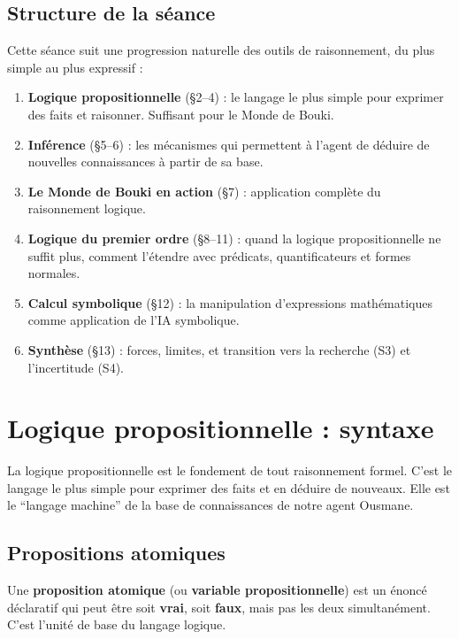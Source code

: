 \documentclass[11pt,a4paper]{article}
\begin{document}
\subsection{Structure de la séance}

Cette séance suit une progression naturelle des outils de raisonnement, du plus simple au plus expressif :

\begin{enumerate}
    \item \textbf{Logique propositionnelle} (§2--4) : le langage le plus simple pour exprimer des faits et raisonner. Suffisant pour le Monde de Bouki.
    \item \textbf{Inférence} (§5--6) : les mécanismes qui permettent à l'agent de déduire de nouvelles connaissances à partir de sa base.
    \item \textbf{Le Monde de Bouki en action} (§7) : application complète du raisonnement logique.
    \item \textbf{Logique du premier ordre} (§8--11) : quand la logique propositionnelle ne suffit plus, comment l'étendre avec prédicats, quantificateurs et formes normales.
    \item \textbf{Calcul symbolique} (§12) : la manipulation d'expressions mathématiques comme application de l'IA symbolique.
    \item \textbf{Synthèse} (§13) : forces, limites, et transition vers la recherche (S3) et l'incertitude (S4).
\end{enumerate}

\section{Logique propositionnelle : syntaxe}

La logique propositionnelle est le fondement de tout raisonnement formel. C'est le langage le plus simple pour exprimer des faits et en déduire de nouveaux. Elle est le ``langage machine'' de la base de connaissances de notre agent Ousmane.

\subsection{Propositions atomiques}

\begin{definitionbox}
Une \textbf{proposition atomique} (ou \textbf{variable propositionnelle}) est un énoncé déclaratif qui peut être soit \textbf{vrai}, soit \textbf{faux}, mais pas les deux simultanément. C'est l'unité de base du langage logique.
\end{definitionbox}
\end{document}

